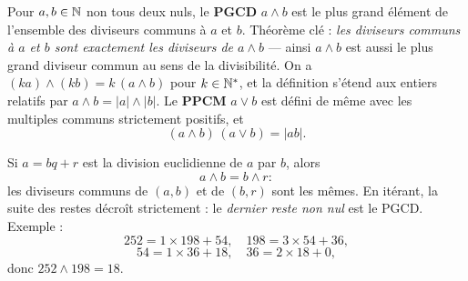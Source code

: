 
\begin{definition}
Pour $a,b\in\mathbb{N}$ non tous deux nuls, le \textbf{PGCD} $a\wedge b$ est le plus
grand élément de l'ensemble des diviseurs communs à $a$ et $b$. Théorème
clé : \emph{les diviseurs communs à $a$ et $b$ sont exactement les diviseurs
de $a\wedge b$} — ainsi $a\wedge b$ est aussi le plus grand diviseur commun
au sens de la divisibilité. On a $(ka)\wedge(kb)=k\,(a\wedge b)$ pour
$k\in\mathbb{N}^{*}$, et la définition s'étend aux entiers relatifs par
$a\wedge b=|a|\wedge|b|$. Le \textbf{PPCM} $a\vee b$ est défini de même avec
les multiples communs strictement positifs, et
\[
  (a\wedge b)\,(a\vee b)=|ab|.
\]
\end{definition}

\noindent
\begin{minipage}[c]{0.56\linewidth}
\begin{theoreme}
Si $a=bq+r$ est la division euclidienne de $a$ par $b$, alors
\[
  a\wedge b=b\wedge r :
\]
les diviseurs communs de $(a,b)$ et de $(b,r)$ sont les mêmes. En itérant,
la suite des restes décroît strictement : le \emph{dernier reste non nul}
est le PGCD. Exemple :
\[
  252=1\times198+54,\quad 198=3\times54+36,
\]
\[
  54=1\times36+18,\quad 36=2\times18+0,
\]
donc $252\wedge198=18$.
\end{theoreme}
\end{minipage}\hfill
\begin{minipage}[c]{0.4\linewidth}
\centering
{}\\[0.5mm]
\end{minipage}

